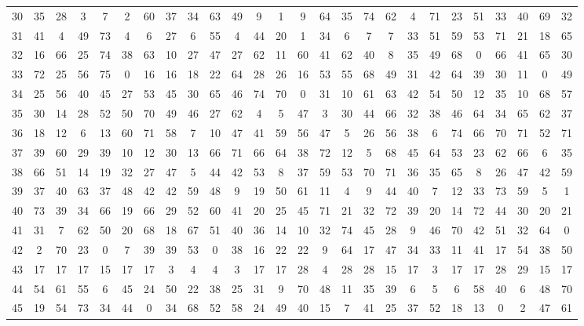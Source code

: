 \begin{table}
\begin{tabular}{c c c c c c c c c c c c c c c c c c c c c c c c c c }
30 & 35 & 28 & 3 & 7 & 2 & 60 & 37 & 34 & 63 & 49 & 9 & 1 & 9 & 64 & 35 & 74 & 62 & 4 & 71 & 23 & 51 & 33 & 40 & 69 & 32 \\
31 & 41 & 4 & 49 & 73 & 4 & 6 & 27 & 6 & 55 & 4 & 44 & 20 & 1 & 34 & 6 & 7 & 7 & 33 & 51 & 59 & 53 & 71 & 21 & 18 & 65 \\
32 & 16 & 66 & 25 & 74 & 38 & 63 & 10 & 27 & 47 & 27 & 62 & 11 & 60 & 41 & 62 & 40 & 8 & 35 & 49 & 68 & 0 & 66 & 41 & 65 & 30 \\
33 & 72 & 25 & 56 & 75 & 0 & 16 & 16 & 18 & 22 & 64 & 28 & 26 & 16 & 53 & 55 & 68 & 49 & 31 & 42 & 64 & 39 & 30 & 11 & 0 & 49 \\
34 & 25 & 56 & 40 & 45 & 27 & 53 & 45 & 30 & 65 & 46 & 74 & 70 & 0 & 31 & 10 & 61 & 63 & 42 & 54 & 50 & 12 & 35 & 10 & 68 & 57 \\
35 & 30 & 14 & 28 & 52 & 50 & 70 & 49 & 46 & 27 & 62 & 4 & 5 & 47 & 3 & 30 & 44 & 66 & 32 & 38 & 46 & 64 & 34 & 65 & 62 & 37 \\
36 & 18 & 12 & 6 & 13 & 60 & 71 & 58 & 7 & 10 & 47 & 41 & 59 & 56 & 47 & 5 & 26 & 56 & 38 & 6 & 74 & 66 & 70 & 71 & 52 & 71 \\
37 & 39 & 60 & 29 & 39 & 10 & 12 & 30 & 13 & 66 & 71 & 66 & 64 & 38 & 72 & 12 & 5 & 68 & 45 & 64 & 53 & 23 & 62 & 66 & 6 & 35 \\
38 & 66 & 51 & 14 & 19 & 32 & 27 & 47 & 5 & 44 & 42 & 53 & 8 & 37 & 59 & 53 & 70 & 71 & 36 & 35 & 65 & 8 & 26 & 47 & 42 & 59 \\
39 & 37 & 40 & 63 & 37 & 48 & 42 & 42 & 59 & 48 & 9 & 19 & 50 & 61 & 11 & 4 & 9 & 44 & 40 & 7 & 12 & 33 & 73 & 59 & 5 & 1 \\
40 & 73 & 39 & 34 & 66 & 19 & 66 & 29 & 52 & 60 & 41 & 20 & 25 & 45 & 71 & 21 & 32 & 72 & 39 & 20 & 14 & 72 & 44 & 30 & 20 & 21 \\
41 & 31 & 7 & 62 & 50 & 20 & 68 & 18 & 67 & 51 & 40 & 36 & 14 & 10 & 32 & 74 & 45 & 28 & 9 & 46 & 70 & 42 & 51 & 32 & 64 & 0 \\
42 & 2 & 70 & 23 & 0 & 7 & 39 & 39 & 53 & 0 & 38 & 16 & 22 & 22 & 9 & 64 & 17 & 47 & 34 & 33 & 11 & 41 & 17 & 54 & 38 & 50 \\
43 & 17 & 17 & 17 & 15 & 17 & 17 & 3 & 4 & 4 & 3 & 17 & 17 & 28 & 4 & 28 & 28 & 15 & 17 & 3 & 17 & 17 & 28 & 29 & 15 & 17 \\
44 & 54 & 61 & 55 & 6 & 45 & 24 & 50 & 22 & 38 & 25 & 31 & 9 & 70 & 48 & 11 & 35 & 39 & 6 & 5 & 6 & 58 & 40 & 6 & 48 & 70 \\
45 & 19 & 54 & 73 & 34 & 44 & 0 & 34 & 68 & 52 & 58 & 24 & 49 & 40 & 15 & 7 & 41 & 25 & 37 & 52 & 18 & 13 & 0 & 2 & 47 & 61 \\

\end{tabular}
\end{table}
